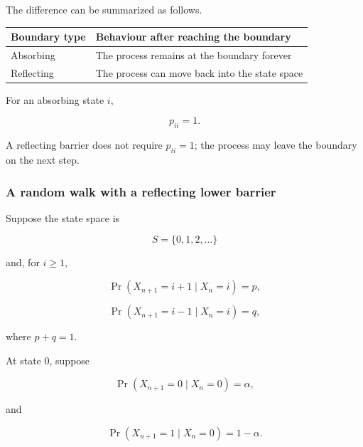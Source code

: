 \documentclass[
  letterpaper,
  DIV=11,
  numbers=noendperiod]{scrartcl}
\newcounter{none} %
\theoremstyle{definition}
\theoremstyle{remark}
\begin{document}
\begin{tcolorbox}[enhanced jigsaw, arc=.35mm, bottomrule=.15mm, bottomtitle=1mm, breakable, colback=white, colbacktitle=quarto-callout-note-color!10!white, colframe=quarto-callout-note-color-frame, coltitle=black, left=2mm, leftrule=.75mm, opacityback=0, opacitybacktitle=0.6, rightrule=.15mm, title=\textcolor{quarto-callout-note-color}{\faInfo}\hspace{0.5em}{Absorbing versus reflecting boundaries}, titlerule=0mm, toprule=.15mm, toptitle=1mm]

The difference can be summarized as follows.

{\def\LTcaptype{none} %
\begin{longtable}[]{@{}ll@{}}
\toprule\noalign{}
Boundary type & Behaviour after reaching the boundary \\
\midrule\noalign{}
\endhead
\bottomrule\noalign{}
\endlastfoot
Absorbing & The process remains at the boundary forever \\
Reflecting & The process can move back into the state space \\
\end{longtable}
}

For an absorbing state \(i\),

\[
p_{ii}=1.
\]

A reflecting barrier does not require \(p_{ii}=1\); the process may
leave the boundary on the next step.

\end{tcolorbox}

\subsubsection{A random walk with a reflecting lower
barrier}\label{a-random-walk-with-a-reflecting-lower-barrier}

Suppose the state space is

\[
S=\{0,1,2,\ldots\}
\]

and, for \(i\geq1\),

\[
\Pr(X_{n+1}=i+1\mid X_n=i)=p,
\]

\[
\Pr(X_{n+1}=i-1\mid X_n=i)=q,
\]

where \(p+q=1\).

At state \(0\), suppose

\[
\Pr(X_{n+1}=0\mid X_n=0)=\alpha,
\]

and

\[
\Pr(X_{n+1}=1\mid X_n=0)=1-\alpha.
\]
\end{document}
